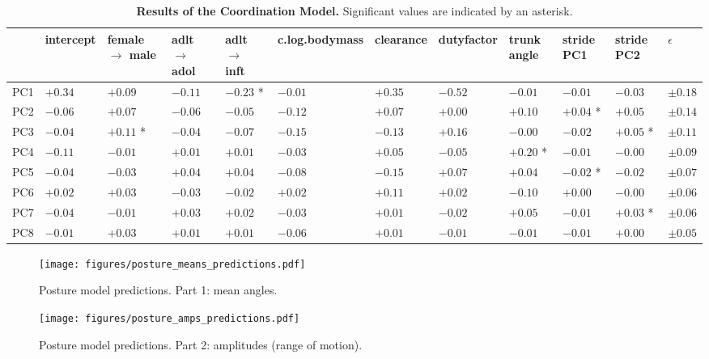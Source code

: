 \begin{landscape}
\begin{table}[b!]
\caption{\label{tab:coordinationresults}\textbf{Results of the Coordination Model.} Significant values are indicated by an asterisk.}
\centering
\scriptsize
\begin{tabular}{llllllllllll}
 & intercept & female \(\rightarrow\) male & adlt \(\rightarrow\) adol & adlt \(\rightarrow\) inft & c.log.bodymass & clearance & dutyfactor & trunk angle & stride PC1 & stride PC2 & \(\epsilon\)\\[0pt]
\hline
PC1 & \(+0.34\) & \(+0.09\) & \(-0.11\) & \(-0.23\) * & \(-0.01\) & \(+0.35\) & \(-0.52\) & \(-0.01\) & \(-0.01\) & \(-0.03\) & \(\pm 0.18\)\\[0pt]
PC2 & \(-0.06\) & \(+0.07\) & \(-0.06\) & \(-0.05\) & \(-0.12\) & \(+0.07\) & \(+0.00\) & \(+0.10\) & \(+0.04\) * & \(+0.05\) & \(\pm 0.14\)\\[0pt]
PC3 & \(-0.04\) & \(+0.11\) * & \(-0.04\) & \(-0.07\) & \(-0.15\) & \(-0.13\) & \(+0.16\) & \(-0.00\) & \(-0.02\) & \(+0.05\) * & \(\pm 0.11\)\\[0pt]
PC4 & \(-0.11\) & \(-0.01\) & \(+0.01\) & \(+0.01\) & \(-0.03\) & \(+0.05\) & \(-0.05\) & \(+0.20\) * & \(-0.01\) & \(-0.00\) & \(\pm 0.09\)\\[0pt]
PC5 & \(-0.04\) & \(-0.03\) & \(+0.04\) & \(+0.04\) & \(-0.08\) & \(-0.15\) & \(+0.07\) & \(+0.04\) & \(-0.02\) * & \(-0.02\) & \(\pm 0.07\)\\[0pt]
PC6 & \(+0.02\) & \(+0.03\) & \(-0.03\) & \(-0.02\) & \(+0.02\) & \(+0.11\) & \(+0.02\) & \(-0.10\) & \(+0.00\) & \(-0.00\) & \(\pm 0.06\)\\[0pt]
PC7 & \(-0.04\) & \(-0.01\) & \(+0.03\) & \(+0.02\) & \(-0.03\) & \(+0.01\) & \(-0.02\) & \(+0.05\) & \(-0.01\) & \(+0.03\) * & \(\pm 0.06\)\\[0pt]
PC8 & \(-0.01\) & \(+0.03\) & \(+0.01\) & \(+0.01\) & \(-0.06\) & \(+0.01\) & \(-0.01\) & \(-0.01\) & \(-0.01\) & \(+0.00\) & \(\pm 0.05\)\\[0pt]
\end{tabular}
\end{table}
\end{landscape}
\clearpage

\begin{figure}[h!]
\centering
\texttt{[image: figures/posture\_means\_predictions.pdf]}
\caption{\label{fig:posture1}Posture model predictions. Part 1: mean angles.}
\end{figure}

\begin{figure}[h!]
\centering
\texttt{[image: figures/posture\_amps\_predictions.pdf]}
\caption{\label{fig:posture2}Posture model predictions. Part 2: amplitudes (range of motion).}
\end{figure}

